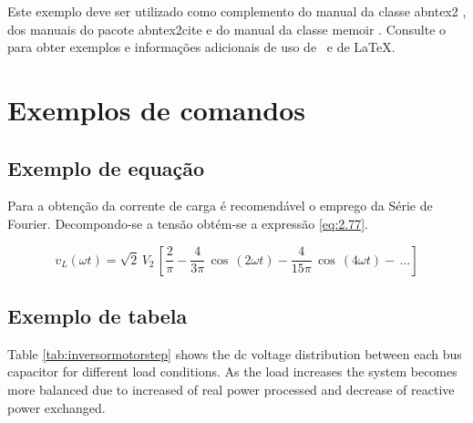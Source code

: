 \documentclass[
	article,			%
	12pt,				%
	twoside,			%
	a4paper,			%
	english,			%
	brazil,				%
	sumario=tradicional
	]{abntex2-modelo-notas-de-aula}
\begin{document}
Este exemplo deve ser utilizado como complemento do manual da classe
\textsf{abntex2} \cite{abntex2classe}, dos manuais do pacote
\textsf{abntex2cite} \cite{abntex2cite,abntex2cite-alf} e do manual da classe
\textsf{memoir} \cite{memoir}. Consulte o  para obter
exemplos e informações adicionais de uso de \abnTeX\ e de \LaTeX.

\newpage
\section{Exemplos de comandos}


\subsection{Exemplo de equação}


Para a obtenção da corrente de carga é recomendável o emprego da Série de Fourier. Decompondo-se a tensão obtém-se a expressão \eqref{eq:2.77}.

\begin{equation}\label{eq:2.77}
	{v_L}(\omega t) = \sqrt 2 \,{V_2}\,\left[ {\frac{2}{\pi } - \frac{4}{{3\pi }}\,\cos \,(2\omega t) - \frac{4}{{15\pi }}\,\cos \,(4\omega t) - \, \ldots } \right]
\end{equation}

\subsection{Exemplo de tabela}


Table \ref{tab:inversormotorstep} shows the dc voltage distribution between each bus capacitor for different load conditions. As the load increases the system becomes more balanced  due to increased of real power processed and decrease of reactive power exchanged.
\end{document}
